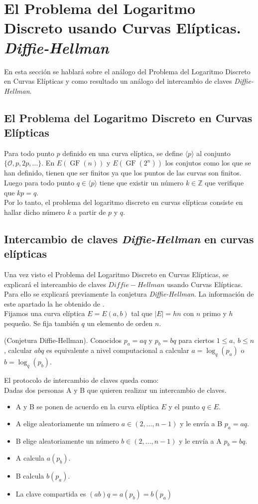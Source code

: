 \section{El Problema del Logaritmo Discreto usando Curvas Elípticas. \emph{Diffie-Hellman}}
En esta sección se hablará sobre el análogo del Problema del Logaritmo Discreto en Curvas Elípticas y como resultado un análogo del intercambio de claves \emph{Diffie-Hellman}.

\subsection{El Problema del Logaritmo Discreto en Curvas Elípticas}
Para todo punto $p$ definido en una curva elíptica, se define $\langle p\rangle$ al conjunto $\{\mathcal{O}, p, 2p, ... \}$.
En $E(\operatorname{GF}(n))$ y $E(\operatorname{GF}(2^n))$ los conjutos como los que se han definido, tienen que ser finitos ya que los puntos de las curvas son finitos. Luego para todo punto $q\in \langle p\rangle$ tiene que existir un número $k \in \mathbb{Z}$ que verifique que $kp=q$.\\
Por lo tanto, el problema del logaritmo discreto en curvas elípticas consiste en hallar dicho número $k$ a partir de $p$ y $q$.
\subsection{Intercambio de claves \emph{Diffie-Hellman} en curvas elípticas}
Una vez visto el Problema del Logaritmo Discreto en Curvas Elípticas, se explicará el intercambio de claves $Diffie-Hellman$ usando Curvas Elípticas. Para ello se explicará previamente la conjetura \emph{Diffie-Hellman}. La información de este apartado la he obtenido de \cite{apuntesCriptografia}.\\
Fijamos una curva elíptica $E=E(a,b)$ tal que $|E|=hn$ con $n$ primo y $h$ pequeño. Se fija también $q$ un elemento de orden $n$.
\begin{definicion}
	(Conjetura Diffie-Hellman). Conocidos $p_a=aq$ y $p_b=bq$ para ciertos $1\leq a,\: b\leq n$, calcular $abq$ es equivalente a nivel computacional a calcular $a=\log_q(p_a)$ o $b=\log_q(p_b)$.
\end{definicion}
El protocolo de intercambio de claves queda como:\\

Dadas dos personas A y B que quieren realizar un intercambio de claves.
\begin{itemize}
	\item A y B se ponen de acuerdo en la curva elíptica $E$ y el punto $q\in E$.
	\item A elige aleatoriamente un número $a\in(2,\dots,n-1)$ y le envía a B $p_a=aq$.
	\item B elige aleatoriamente un número $b\in(2,\dots,n-1)$ y le envía a A $p_b=bq$.
	\item A calcula $a(p_b)$.
	\item B calcula $b(p_a)$.
	\item La clave compartida es $(ab)q=a(p_b)=b(p_a)$
\end{itemize}

